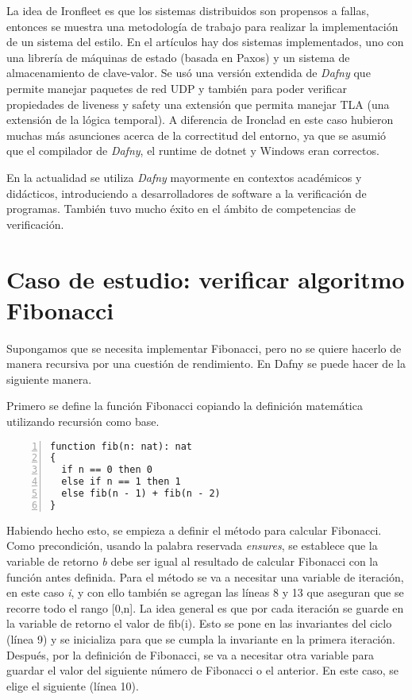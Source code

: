 \documentclass[runningheads]{llncs}
\begin{document}
La idea de Ironfleet\cite{hawblitzel2015ironfleet} es que los sistemas distribuidos son propensos a fallas, entonces se muestra una metodología de trabajo para realizar la implementación de un 
sistema del estilo. En el artículos hay dos sistemas implementados, uno con una librería de máquinas de estado (basada en Paxos) y un sistema de almacenamiento de clave-valor.
Se usó una versión extendida de \textit{Dafny} que permite manejar paquetes de red UDP y también para poder verificar propiedades de liveness y safety una extensión que permita manejar TLA 
(una extensión de la lógica temporal).
A diferencia de Ironclad en este caso hubieron muchas más asunciones acerca de la correctitud del entorno, ya que se asumió que el compilador de \textit{Dafny}, el runtime de dotnet y Windows eran correctos.

En la actualidad se utiliza \textit{Dafny} mayormente en contextos académicos y didácticos, introduciendo a desarrolladores de software a la verificación de programas.
También tuvo mucho éxito en el ámbito de competencias de verificación.


\section{Caso de estudio: verificar algoritmo Fibonacci}
Supongamos que se necesita implementar Fibonacci, pero no se quiere hacerlo de manera recursiva por una cuestión de rendimiento. En Dafny se puede hacer de la siguiente manera.

Primero se define la función Fibonacci copiando la definición matemática utilizando recursión como base.

\begin{Verbatim}[numbers=left,xleftmargin=5mm]
function fib(n: nat): nat
{
  if n == 0 then 0
  else if n == 1 then 1
  else fib(n - 1) + fib(n - 2)
}
\end{Verbatim}

Habiendo hecho esto, se empieza a definir el método para calcular Fibonacci.
Como precondición, usando la palabra reservada \textit{ensures}, se establece que la variable de retorno \textit{b} debe ser igual al resultado de calcular Fibonacci con la función antes definida.
Para el método se va a necesitar una variable de iteración, en este caso \textit{i}, y con ello también se agregan las líneas 8 y 13 que aseguran que se recorre todo el rango [0,n].
La idea general es que por cada iteración se guarde en la variable de retorno el valor de fib(i). Esto se pone en las invariantes del ciclo (línea 9)
y se inicializa para que se cumpla la invariante en la primera iteración. Después, por la definición de Fibonacci, se va a necesitar otra variable para guardar el valor del siguiente número de
Fibonacci o el anterior. En este caso, se elige el siguiente (línea 10).
\end{document}
